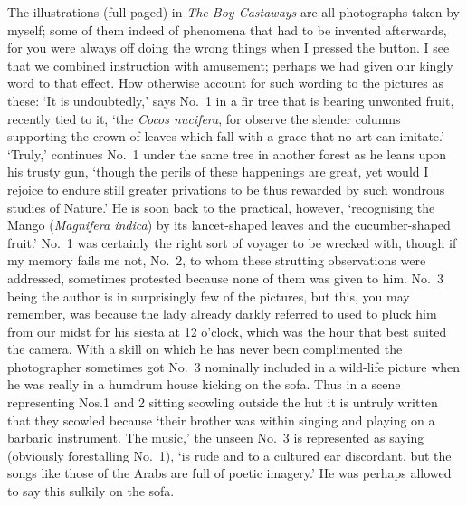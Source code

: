 The illustrations (full-paged) in \emph{The Boy Castaways} are all photographs taken by myself;
some of them indeed of phenomena that had to be invented afterwards,
for you were always off doing the wrong things when I pressed the button.
I see that we combined instruction with amusement;
perhaps we had given our kingly word to that effect.
How otherwise account for such wording to the pictures as these:
‘It is undoubtedly,’ says No.~1 in a fir tree that is bearing unwonted fruit, recently tied to it,
‘the \emph{Cocos nucifera},
for observe the slender columns supporting the crown of leaves which fall
with a grace that no art can imitate.’
‘Truly,’ continues No.~1 under the same tree in another forest as he leans upon his trusty gun,
‘though the perils of these happenings are great,
yet would I rejoice to endure still greater privations
to be thus rewarded by such wondrous studies of Nature.’
He is soon back to the practical, however,
‘recognising the Mango (\emph{Magnifera indica})
by its lancet-shaped leaves and the cucumber-shaped fruit.’
No.~1 was certainly the right sort of voyager to be wrecked with,
though if my memory fails me not, No.~2, to whom these strutting observations were addressed,
sometimes protested because none of them was given to him.
No.~3 being the author is in surprisingly few of the pictures,
but this, you may remember, was because the lady already darkly referred to
used to pluck him from our midst for his siesta at 12 o’clock,
which was the hour that best suited the camera.
With a skill on which he has never been complimented
the photographer sometimes got No.~3 nominally included in a wild-life picture
when he was really in a humdrum house kicking on the sofa.
Thus in a scene representing Nos.\@ 1 and 2 sitting scowling outside the hut
it is untruly written that they scowled because
‘their brother was within singing and playing on a barbaric instrument.
The music,’ the unseen No.~3 is represented as saying (obviously forestalling No.~1),
‘is rude and to a cultured ear discordant,
but the songs like those of the Arabs are full of poetic imagery.’
He was perhaps allowed to say this sulkily on the sofa.

